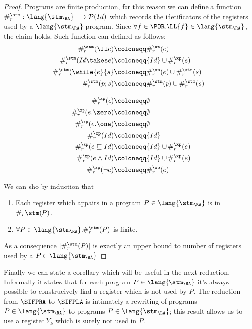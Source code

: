 \begin{proof}
Programs are finite production, for this reason we can define a function
$\#_r^\stm:\lang{\stm_\RA}\longrightarrow \mathcal P(Id)$ which records
the idetificators of the registers used by a $\lang{\stm_\RA}$ program.
Since $\forall f \in \POR.\LL{f} \in \lang{\stm_\RA}$, the claim holds.
Such function can defined as follows:
\begin{align*}
\#_r^\stm(\fl e)&\coloneqq \#_r^\xp(e)\\
\#_r^\stm(Id\takes e)&\coloneqq \{Id\}\cup \#_r^\xp(e)\\
\#_r^\stm(\while{e}{s}&\coloneqq \#_r^\xp(e)\cup \#_r^\stm(s)\\
\#_r^\stm(p;s)&\coloneqq \#_r^\stm(p)\cup \#_r^\stm(s)\\[2ex]
\#_r^\xp(\epsilon)&\coloneqq \emptyset\\
\#_r^\xp(e.\zero)&\coloneqq \emptyset\\
\#_r^\xp(e.\one)&\coloneqq \emptyset\\
\#_r^\xp(Id)&\coloneqq \{Id\}\\
\#_r^\xp(e \sqsubseteq Id)&\coloneqq \{Id\}\cup \#_r^\xp(e)\\
\#_r^\xp(e \land Id)&\coloneqq \{Id\}\cup \#_r^\xp(e)\\
\#_r^\xp(\lnot e )&\coloneqq \#_r^\xp(e)\\
\end{align*}

We can sho by induction that
\begin{enumerate}
\item Each register which appairs in a program $P \in \lang{\stm_\RA}$ is in
$\#_r\stm(P)$.
\item $\forall P \in \lang{\stm_\RA}. \#_r^\stm(P)$ is finite.
\end{enumerate}

As a consequence $|\#_r^\stm(P)|$ is exactly an upper bound to
number of registers used by a $P \in \lang{\stm_\RA}$
\end{proof}

Finally we can state a corollary which will be useful in the next reduction.
Informally it states that for each program $P \in\lang{\stm_\RA}$
it's always possible to construcively
find a register which is not used by $P$.
The reduction from $\SIFPRA$ to $\SIFPLA$ is intimately a rewriting of
programs $P \in \lang{\stm_\RA}$ to programs $P \in \lang{\stm_\LA}$;
this result allows us to use a register $Y_k$ which is surely not used in $P$.

